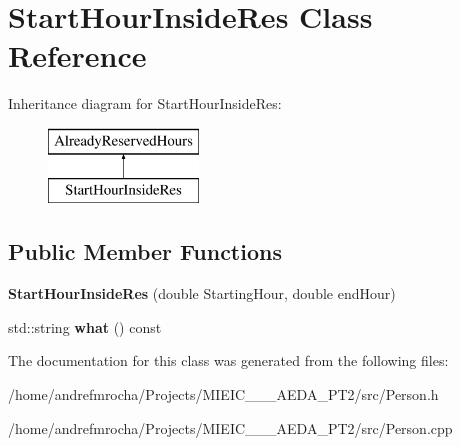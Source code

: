 \hypertarget{class_start_hour_inside_res}{}\section{Start\+Hour\+Inside\+Res Class Reference}
\label{class_start_hour_inside_res}
Inheritance diagram for Start\+Hour\+Inside\+Res\+:\begin{figure}[H]
\begin{center}
\leavevmode
\includegraphics[height=2.000000cm]{class_start_hour_inside_res}
\end{center}
\end{figure}
\subsection*{Public Member Functions}
\begin{DoxyCompactItemize}
\item 
\mbox{\label{class_start_hour_inside_res_a6c05984e1473ec49ce644ecfaecab8fc}} 
{\bfseries Start\+Hour\+Inside\+Res} (double Starting\+Hour, double end\+Hour)
\item 
\mbox{\label{class_start_hour_inside_res_a90b45cf2a2d4f0adcf7d9f650bee1574}} 
std\+::string {\bfseries what} () const
\end{DoxyCompactItemize}


The documentation for this class was generated from the following files\+:\begin{DoxyCompactItemize}
\item 
/home/andrefmrocha/\+Projects/\+M\+I\+E\+I\+C\+\_\+\_\+\_\+\+A\+E\+D\+A\+\_\+\+P\+T2/src/Person.\+h\item 
/home/andrefmrocha/\+Projects/\+M\+I\+E\+I\+C\+\_\+\_\+\_\+\+A\+E\+D\+A\+\_\+\+P\+T2/src/Person.\+cpp\end{DoxyCompactItemize}
